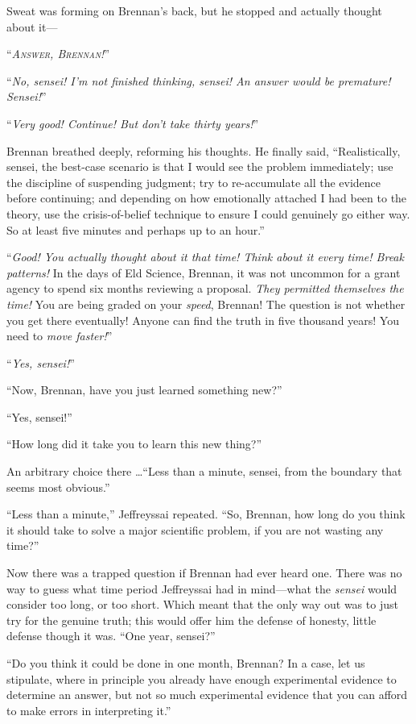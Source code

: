 {
 Sweat was forming on Brennan's back, but he
stopped and actually thought about it---}

{
 ``\textit{\textsc{Answer, Brennan!}}''}

{
 ``\textit{No, sensei! I'm not
finished thinking, sensei! An answer would be premature!
Sensei!}''}

{
 ``\textit{Very good! Continue! But
don't take thirty years!}''}

{
 Brennan breathed deeply, reforming his thoughts. He finally said,
``Realistically, sensei, the best-case scenario is
that I would see the problem immediately; use the discipline of
suspending judgment; try to re-accumulate all the evidence before
continuing; and depending on how emotionally attached I had been to the
theory, use the crisis-of-belief technique to ensure I could genuinely
go either way. So at least five minutes and perhaps up to an
hour.''}

{
 ``\textit{Good! You actually thought about it
that time! Think about it every time! Break patterns!} In the days of
Eld Science, Brennan, it was not uncommon for a grant agency to spend
six months reviewing a proposal. \textit{They permitted themselves the
time!} You are being graded on your \textit{speed}, Brennan! The
question is not whether you get there eventually! Anyone can find the
truth in five thousand years! You need to \textit{move
faster!}''}

{
 ``\textit{Yes, sensei!}''}

{
 ``Now, Brennan, have you just learned something
new?''}

{
 ``Yes, sensei!''}

{
 ``How long did it take you to learn this new
thing?''}

{
 An arbitrary choice there \ldots ``Less than a
minute, sensei, from the boundary that seems most
obvious.''}

{
 ``Less than a minute,''
Jeffreyssai repeated. ``So, Brennan, how long do you
think it should take to solve a major scientific problem, if you are
not wasting any time?''}

{
 Now there was a trapped question if Brennan had ever heard one.
There was no way to guess what time period Jeffreyssai had in
mind---what the \textit{sensei} would consider too long, or too short.
Which meant that the only way out was to just try for the genuine
truth; this would offer him the defense of honesty, little defense
though it was. ``One year,
sensei?''}

{
 ``Do you think it could be done in one month,
Brennan? In a case, let us stipulate, where in principle you already
have enough experimental evidence to determine an answer, but not so
much experimental evidence that you can afford to make errors in
interpreting it.''}

